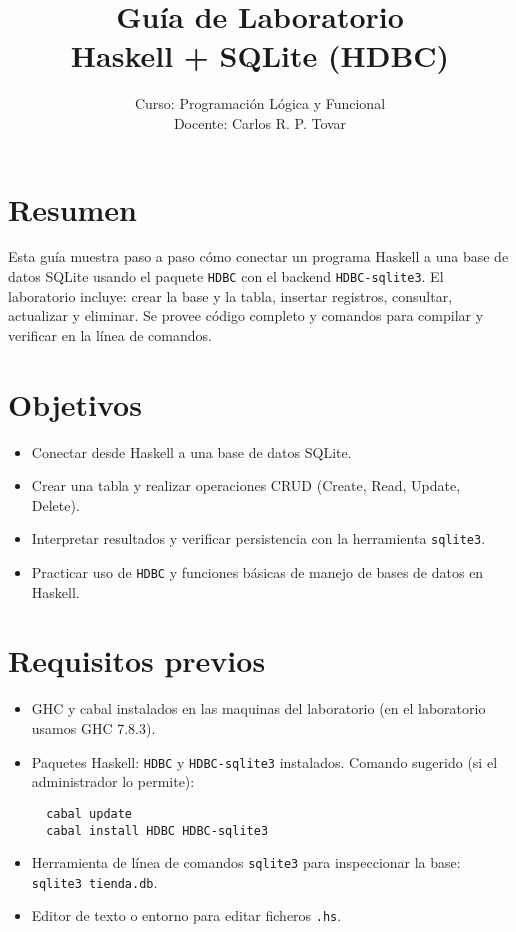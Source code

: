 \documentclass[12pt]{article}
\title{Gu\'ia de Laboratorio\\Haskell + SQLite (HDBC)}
\author{Curso: Programaci\'on L\'ogica y Funcional \\ Docente: Carlos R. P. Tovar}
\date{}
\begin{document}
\maketitle

\section*{Resumen}
Esta gu\'ia muestra paso a paso c\'omo conectar un programa Haskell a una base de datos SQLite usando el paquete \texttt{HDBC} con el backend \texttt{HDBC-sqlite3}. El laboratorio incluye: crear la base y la tabla, insertar registros, consultar, actualizar y eliminar. Se provee c\'odigo completo y comandos para compilar y verificar en la l\'inea de comandos.

\section*{Objetivos}
\begin{itemize}
  \item Conectar desde Haskell a una base de datos SQLite.
  \item Crear una tabla y realizar operaciones CRUD (Create, Read, Update, Delete).
  \item Interpretar resultados y verificar persistencia con la herramienta \texttt{sqlite3}.
  \item Practicar uso de \texttt{HDBC} y funciones b\'asicas de manejo de bases de datos en Haskell.
\end{itemize}

\section*{Requisitos previos}
\begin{itemize}
  \item GHC y cabal instalados en las maquinas del laboratorio (en el laboratorio usamos GHC 7.8.3).
  \item Paquetes Haskell: \texttt{HDBC} y \texttt{HDBC-sqlite3} instalados. Comando sugerido (si el administrador lo permite):
  \begin{verbatim}
  cabal update
  cabal install HDBC HDBC-sqlite3
  \end{verbatim}
  \item Herramienta de l\'inea de comandos \texttt{sqlite3} para inspeccionar la base: \verb|sqlite3 tienda.db|.
  \item Editor de texto o entorno para editar ficheros \texttt{.hs}.
\end{itemize}
\end{document}
